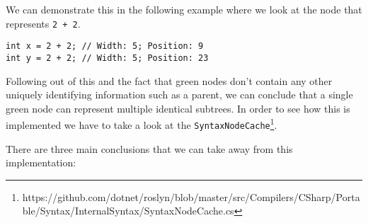We can demonstrate this in the following example where we look at the node that represents \verb|2 + 2|.

\begin{lstlisting}
int x = 2 + 2; // Width: 5; Position: 9
int y = 2 + 2; // Width: 5; Position: 23
\end{lstlisting}

Following out of this and the fact that green nodes don't contain any other uniquely identifying information such as a parent, we can conclude that a single green node can represent multiple identical subtrees. In order to see how this is implemented we have to take a look at the \verb|SyntaxNodeCache|\footnote{https://github.com/dotnet/roslyn/blob/master/src/Compilers/CSharp/Portable/Syntax/InternalSyntax/SyntaxNodeCache.cs}.

There are three main conclusions that we can take away from this implementation:

